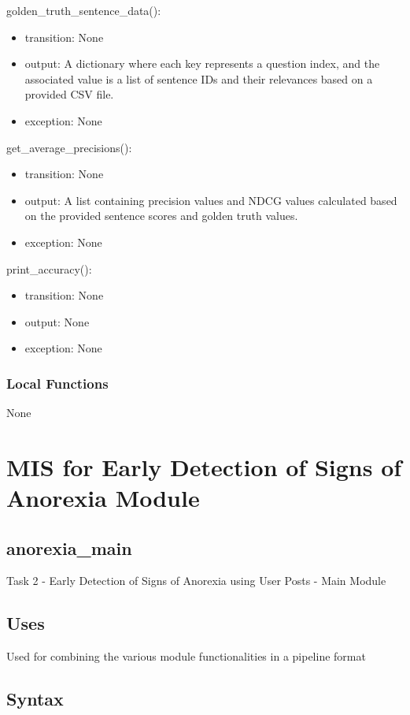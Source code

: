\documentclass[12pt, titlepage]{article}
\begin{document}
\noindent golden\_truth\_sentence\_data():
\begin{itemize}
\item transition: None
\item output: A dictionary where each key represents a question index, and the associated value is a list of sentence IDs and their relevances based on a provided CSV file.
\item exception: None
\end{itemize}
\noindent get\_average\_precisions():
\begin{itemize}
\item transition: None
\item output: A list containing precision values and NDCG values calculated based on the provided sentence scores and golden truth values.
\item exception: None
\end{itemize}
\noindent print\_accuracy():
\begin{itemize}
\item transition: None
\item output: None
\item exception: None
\end{itemize}

\subsubsection{Local Functions}

None

\newpage

\section{MIS for Early Detection of Signs of Anorexia Module} \label{Module} 

\subsection{anorexia\_main}

Task 2 - Early Detection of Signs of Anorexia using User Posts - Main Module

\subsection{Uses}

Used for combining the various module functionalities in a pipeline format

\subsection{Syntax}
\end{document}
